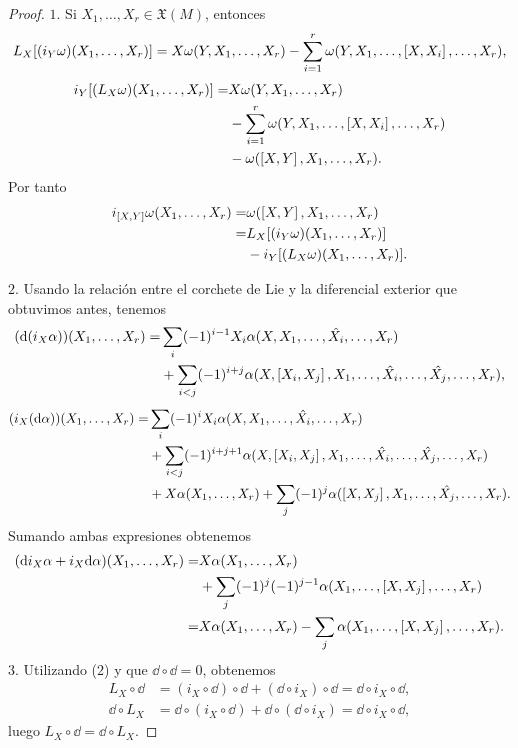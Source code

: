 \begin{proof}\leavevmode

    $1$. Si $X_1,\dots,X_r \in \mathfrak{X}(M)$, entonces
      \begin{equation*}
	L_X[(i_Y \omega) (X_1,\dots,X_r)] = X \omega(Y,X_1,\dots,X_r)-\sum_{i=1}^r \omega(Y,X_1,\dots,\left[X,X_i\right],\dots,X_r), 
      \end{equation*}
      \begin{align*}
	i_Y[(L_X \omega) (X_1,\dots,X_r)] =&  X \omega(Y,X_1,\dots,X_r) \\ 
	& -\sum_{i=1}^r \omega(Y,X_1,\dots,\left[X,X_i\right],\dots,X_r) \\
	&- \omega(\left[X,Y\right],X_1,\dots,X_r).
      \end{align*}
      Por tanto
      \begin{align*}
	i_{\left[X,Y\right]}\omega (X_1,\dots,X_r) =&\omega(\left[X,Y\right],X_1,\dots,X_r) \\
	=& L_X[(i_Y \omega) (X_1,\dots,X_r)] \\
	&-i_Y[(L_X \omega) (X_1,\dots,X_r)].
      \end{align*}

    $2$. Usando la relación entre el corchete de Lie y la diferencial exterior que obtuvimos antes, tenemos
      \begin{align*}
	(\mathrm{d} (i_X \alpha)) (X_1,\dots,X_r) =& \sum_{i}(-1)^{i-1}X_i \alpha(X,X_1,\dots,\hat{X_i},\dots,X_r) \\
	& + \sum_{i<j} (-1)^{i+j} \alpha (X,\left[X_i,X_j\right],X_1,\dots,\hat{X_i},\dots,\hat{X_j},\dots,X_r),
      \end{align*}
      \begin{align*}
	(i_X (\mathrm{d} \alpha)) (X_1,\dots,X_r) =& \sum_{i}(-1)^{i}X_i \alpha(X,X_1,\dots,\hat{X_i},\dots,X_r) \\
	& + \sum_{i<j} (-1)^{i+j+1} \alpha (X,\left[X_i,X_j\right],X_1,\dots,\hat{X_i},\dots,\hat{X_j},\dots,X_r) \\
	& + X\alpha(X_1,\dots,X_r) + \sum_j (-1)^{j} \alpha (\left[X,X_j\right],X_1,\dots,\hat{X_j},\dots,X_r).
      \end{align*}
      Sumando ambas expresiones obtenemos
      \begin{align*}
	(\mathrm{d} i_X \alpha +i_X \mathrm{d} \alpha) (X_1,\dots,X_r) = & X\alpha(X_1,\dots,X_r) \\
	& + \sum_j (-1)^{j} (-1)^{j-1} \alpha (X_1,\dots,\left[X,X_j\right],\dots,X_r) \\
	= & X\alpha(X_1,\dots,X_r) - \sum_j \alpha (X_1,\dots,\left[X,X_j\right],\dots,X_r). 
      \end{align*}
    $3$. Utilizando ($2$) y que $\dd \circ \dd=0$, obtenemos
      \begin{align*}
	L_X \circ \dd &= (i_X \circ \dd) \circ \dd + (\dd \circ i_X) \circ \dd = \dd \circ i_X \circ \dd, \\
	\dd \circ L_X &= \dd \circ (i_X \circ \dd) + \dd \circ (\dd \circ i_X) = \dd \circ i_X \circ \dd,
      \end{align*}
      luego $L_X \circ \dd= \dd \circ L_X$.
\end{proof}

